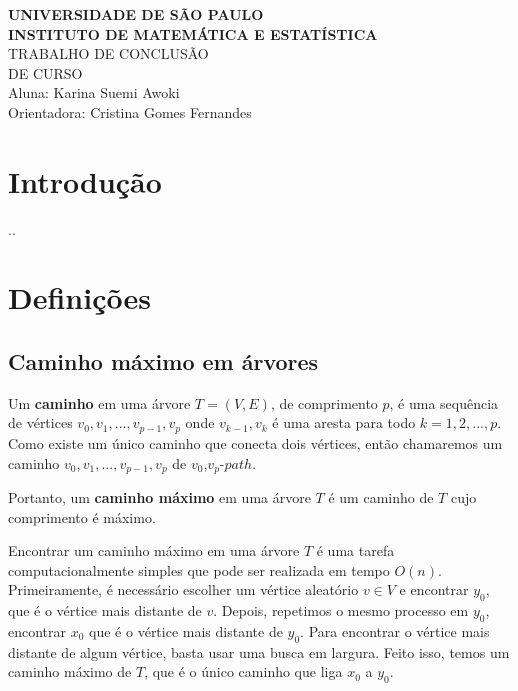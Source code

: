 \documentclass[a4paper,12pt]{article}
\begin{document}
\begin{center}
   {\large \textbf{UNIVERSIDADE DE SÃO PAULO}} \\[1.4cm]
   
   {\large \textbf{INSTITUTO DE MATEMÁTICA E ESTATÍSTICA}}\\[4.2cm]
   
   {\Huge TRABALHO DE CONCLUSÃO }\\[0.3cm]
   {\Huge DE CURSO }\\[9cm]
   
   {\large { Aluna: Karina Suemi Awoki}}\\[0.3cm]
   
   {\large { Orientadora: Cristina Gomes Fernandes}}
   

\end{center}

\newpage
\section{Introdução}
..
\bigskip

\section{Definições}
    
    \subsection{Caminho máximo em árvores}

    	Um \textbf{caminho} em uma árvore $T=(V,E)$, de 
    	comprimento $p$, é uma sequência de vértices 
    	$v_0, v_1, ...,v_{p-1}, v_p$ 
    	onde {$v_{k-1}, v_k$} é uma aresta para todo 
    	$k = 1,2,..., p$. 
    	Como existe um único caminho que conecta dois vértices,
    	então chamaremos um caminho $v_0, v_1, ...,v_{p-1}, v_p$ de
    	$v_0$,$v_p$-$path$.

    	Portanto, um \textbf{caminho máximo} em uma árvore $T$ é
    	um caminho de $T$ cujo comprimento é máximo.

    	Encontrar um caminho máximo em uma árvore $T$ é uma tarefa
    	computacionalmente simples que pode ser realizada em tempo 
    	$O(n)$. 
    	Primeiramente, é necessário escolher um vértice aleatório 
    	$v \in V$ e encontrar $y_0$,
    	que é o vértice mais distante de $v$.
    	Depois, repetimos o mesmo processo em $y_0$, encontrar
    	$x_0$ que é o vértice mais distante de $y_0$. 
    	Para encontrar o vértice mais distante de algum vértice, 
    	basta usar uma busca em largura.  
    	Feito isso, temos um caminho máximo de $T$, que é o único
    	caminho que liga $x_0$ a $y_0$.
\end{document}
